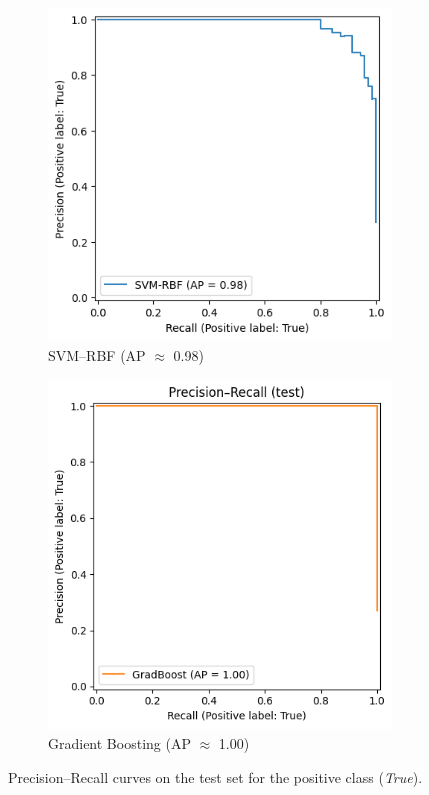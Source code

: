 \documentclass[journal]{IEEEtran}
\begin{document}
\begin{figure}[H]
	\centering
	\begin{subfigure}{.48\linewidth}
		\centering
		\includegraphics[width=\linewidth]{assets/svm_pr.png}%
		\caption{SVM--RBF (AP $\approx$ 0.98)}
	\end{subfigure}\hfill
	\begin{subfigure}{.48\linewidth}
		\centering
		\includegraphics[width=\linewidth]{assets/gb_pr.png}%
		\caption{Gradient Boosting (AP $\approx$ 1.00)}
	\end{subfigure}
	\caption{Precision--Recall curves on the test set for the positive class (\emph{True}).}
	\label{fig:pr-nonlinear}
\end{figure}
\end{document}
